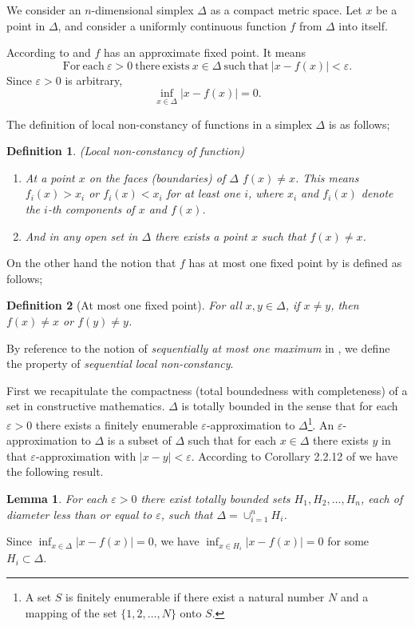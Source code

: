 \documentclass[reqno]{amsart}
\newtheorem{lem}{Lemma}
\newtheorem{definition}{Definition}
\begin{document}
We consider an $n$-dimensional simplex $\Delta$ as a compact metric space. Let $x$ be a point in $\Delta$, and consider a uniformly continuous function $f$ from $\Delta$ into itself.

 According to \cite{da} and \cite{veld} $f$ has an approximate fixed point. It means 
\[\mathrm{For\ each}\ \varepsilon>0\ \mathrm{there\ exists}\ x\in \Delta\ \mathrm{such\ that}\ |x-f(x)|<\varepsilon.\]
Since $\varepsilon>0$ is arbitrary,
\[\inf_{x\in \Delta}|x-f(x)|=0.\]

The definition of local non-constancy of functions in a simplex $\Delta$ is as follows;
\begin{definition}(Local non-constancy of function)
\begin{enumerate}
	\item At a point $x$ on the faces (boundaries) of $\Delta$ $f(x)\neq x$. This means $f_i(x)>x_i$ or $f_i(x)<x_i$ for at least one $i$, where $x_i$ and $f_i(x)$ denote the $i$-th components of $x$ and $f(x)$.
	\item And in any open set in $\Delta$ there exists a point $x$ such that $f(x)\neq x$.
\end{enumerate}
\end{definition}

On the other hand the notion that $f$ has at most one fixed point by \cite{berger} is defined as follows;
\begin{definition}[At most one fixed point]
For all $x, y\in \Delta$, if $x\neq y$, then $f(x)\neq x$ or $f(y)\neq y$.
\end{definition}

By reference to the notion of \emph{sequentially at most one maximum} in \cite{berg},  we define the property of \emph{sequential local non-constancy}.

First we recapitulate the compactness (total boundedness with completeness) of a set in constructive mathematics. $\Delta$ is totally bounded in the sense that for each $\varepsilon>0$ there exists a finitely enumerable $\varepsilon$-approximation to $\Delta$\footnote{A set $S$ is finitely enumerable if there exist a natural number $N$ and a mapping of the set $\{1, 2, \dots, N\}$ onto $S$.}. An $\varepsilon$-approximation to $\Delta$ is a subset of $\Delta$ such that for each $x\in \Delta$ there exists $y$ in that $\varepsilon$-approximation with $|x-y|<\varepsilon$. According to Corollary 2.2.12 of \cite{bv} we have the following result.
\begin{lem}
For each $\varepsilon>0$ there exist totally bounded sets $H_1, H_2, \dots, H_n$, each of diameter less than or equal to $\varepsilon$, such that $\Delta=\cup_{i=1}^nH_i$.\label{closed}
\end{lem}
Since $\inf_{x\in \Delta}|x-f(x)|=0$, we have $\inf_{x\in H_i}|x-f(x)|=0$ for some $H_i\subset \Delta$.
\end{document}
